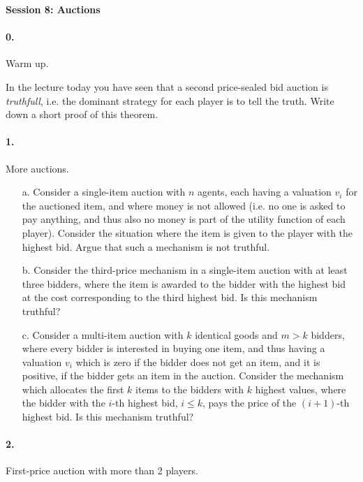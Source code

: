 \documentclass[a4paper,notitlepage,12pt]{article}
\begin{document}
\setlength{\parindent}{0pt}
\setlength{\parskip}{1ex plus 0.5ex minus 0.2ex}

\large

\textbf{Session 8: Auctions}



\paragraph{0. } Warm up. 

In the lecture today you have seen that a second price-sealed bid auction is \emph{truthfull}, i.e. the dominant strategy for each player is to tell the truth. Write down a short proof of this theorem.

\paragraph{1. } More auctions.
\begin{enumerate}
 \item[a.]
  Consider a single-item auction with $n$ agents, each having a valuation $v_i$ for the auctioned item, and where money is not allowed (i.e. no one is asked to pay anything, and thus also no money is part of the utility function of each player). Consider the situation where the item is given to the player with the highest bid. Argue that such a mechanism is not truthful. 
 \item[b.]
 Consider the third-price mechanism in a single-item auction with at least three bidders, where the item is awarded to the bidder with the highest bid at the cost corresponding to the third highest bid. Is this mechanism truthful? 
 \item[c.]
 Consider a multi-item auction with $k$ identical goods and $m > k$ bidders, where every bidder is interested in buying one item, and thus having a valuation $v_i$ which is zero if the bidder does not get an item, and it is positive, if the bidder gets an item in the auction. Consider the mechanism which allocates the first $k$ items to the bidders with $k$ highest values, where the bidder with the $i$-th highest bid, $i \leq k$, pays the price of the $(i +1)$-th highest bid. Is this mechanism truthful?
\end{enumerate}

\paragraph{2. } First-price auction with more than 2 players.
\end{document}
